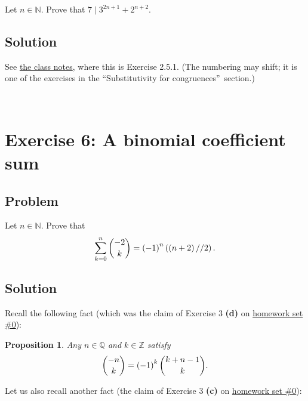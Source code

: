 \documentclass[paper=a4, fontsize=12pt]{scrartcl}%
\let\sumnonlimits\sum
\renewcommand{\sum}{\sumnonlimits\limits}
\theoremstyle{plainsl}
\newtheorem{proposition}[theorem]{Proposition}
\theoremstyle{definition}
\theoremstyle{remark}
\begin{document}
Let $n \in\mathbb{N}$. Prove that $7 \mid3^{2n+1} + 2^{n+2}$.

\subsection{Solution}

See \href{http://www.cip.ifi.lmu.de/~grinberg/t/19s/notes.pdf}{the class
notes}, where this is Exercise 2.5.1. (The numbering may shift; it is one of
the exercises in the \textquotedblleft Substitutivity for
congruences\textquotedblright\ section.)

\rule{0pt}{0.3pt} \\[0.4cm]

\section{Exercise 6: A binomial coefficient sum}

\subsection{Problem}

Let $n \in\mathbb{N}$. Prove that
\begin{align}
\sum_{k=0}^{n} \dbinom{-2}{k} = \left(  -1 \right)  ^{n} \left(  \left(  n+2
\right)  // 2 \right)  .
\end{align}


\subsection{Solution}

Recall the following fact (which was the claim of Exercise 3 \textbf{(d)} on
\href{http://www.cip.ifi.lmu.de/~grinberg/t/19s/hw0s.pdf}{homework set \#0}):

\begin{proposition}
\label{prop.sol.binom.-2choosek-sum.upneg}Any $n\in\mathbb{Q}$ and
$k\in\mathbb{Z}$ satisfy
\[
\dbinom{-n}{k}=\left(  -1\right)  ^{k}\dbinom{k+n-1}{k}.
\]

\end{proposition}

Let us also recall another fact (the claim of Exercise 3 \textbf{(c)} on
\href{http://www.cip.ifi.lmu.de/~grinberg/t/19s/hw0s.pdf}{homework set \#0}):
\end{document}
